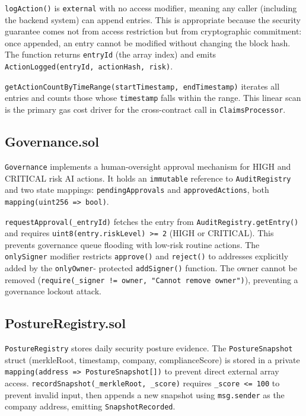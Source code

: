 \documentclass[12pt,a4paper]{article}
\begin{document}
\texttt{logAction()} is \texttt{external} with no access modifier,
meaning any caller (including the backend system) can append entries.
This is appropriate because the security guarantee comes not from
access restriction but from cryptographic commitment: once appended,
an entry cannot be modified without changing the block hash.
The function returns \texttt{entryId} (the array index) and emits
\texttt{ActionLogged(entryId, actionHash, risk)}.

\texttt{getActionCountByTimeRange(startTimestamp, endTimestamp)}
iterates all entries and counts those whose \texttt{timestamp} falls
within the range. This linear scan is the primary gas cost driver for
the cross-contract call in \texttt{ClaimsProcessor}.

\subsection{Governance.sol}
\label{sec:governance}

\texttt{Governance} implements a human-oversight approval mechanism
for HIGH and CRITICAL risk AI actions. It holds an
\texttt{immutable} reference to \texttt{AuditRegistry} and two
state mappings: \texttt{pendingApprovals} and \texttt{approvedActions},
both \texttt{mapping(uint256 => bool)}.

\texttt{requestApproval(\_entryId)} fetches the entry from
\texttt{AuditRegistry.getEntry()} and requires
\texttt{uint8(entry.riskLevel) >= 2} (HIGH or CRITICAL). This prevents
governance queue flooding with low-risk routine actions. The
\texttt{onlySigner} modifier restricts \texttt{approve()} and
\texttt{reject()} to addresses explicitly added by the \texttt{onlyOwner}-
protected \texttt{addSigner()} function. The owner cannot be removed
(\texttt{require(\_signer != owner, "Cannot remove owner")}),
preventing a governance lockout attack.

\subsection{PostureRegistry.sol}
\label{sec:posture-registry}

\texttt{PostureRegistry} stores daily security posture evidence.
The \texttt{PostureSnapshot} struct (merkleRoot, timestamp, company,
complianceScore) is stored in a private
\texttt{mapping(address => PostureSnapshot[])} to prevent direct
external array access. \texttt{recordSnapshot(\_merkleRoot, \_score)}
requires \texttt{\_score <= 100} to prevent invalid input, then
appends a new snapshot using \texttt{msg.sender} as the company
address, emitting \texttt{SnapshotRecorded}.
\end{document}
